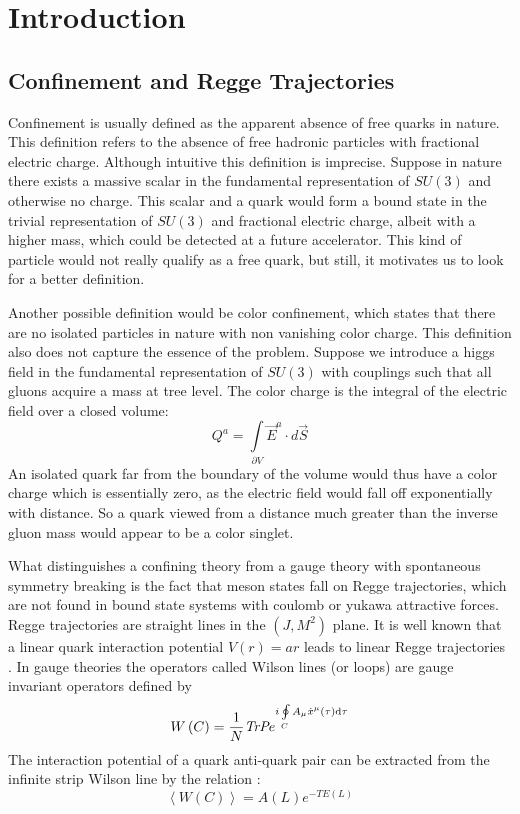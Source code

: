 \documentclass[11pt,a4paper]{article}
\begin{document}
\section{Introduction}
\FloatBarrier
\subsection{Confinement and Regge Trajectories}

Confinement\cite{Greensite08} is usually defined as the apparent absence of free quarks in nature. This definition refers to the absence of free hadronic particles with fractional electric charge. Although intuitive this definition is imprecise. Suppose in nature there exists a massive scalar in the fundamental representation of $SU\left(3\right)$ and otherwise no charge. This scalar and a quark would form a bound state in the trivial representation of $SU\left(3\right)$ and fractional electric charge, albeit with a higher mass, which could be detected at a future accelerator. This kind of particle would not really qualify as a free quark, but still, it motivates us to look for a better definition.

Another possible definition would be color confinement, which states that there are no isolated particles in nature with non vanishing color charge. This definition also does not capture the essence of the problem. Suppose we introduce a higgs field in the fundamental representation of $SU\left(3\right)$ with couplings such that all gluons acquire a mass at tree level. The color charge is the integral of the electric field over a closed volume:
\begin{equation}
Q^a=\int\limits_{\partial V} \vec{E}^a \cdot d\vec{S}
\end{equation}
An isolated quark far from the boundary of the volume would thus have a color charge which is essentially zero, as the electric field would fall off exponentially with distance. So a quark viewed from a distance much greater than the inverse gluon mass would appear to be a color singlet.

What distinguishes a confining theory from a gauge theory with spontaneous symmetry breaking is the fact that meson states fall on Regge trajectories, which are not found in bound state systems with coulomb or yukawa attractive forces. Regge trajectories are straight lines in the $\left(J,M^2\right)$ plane. It is well known that a linear quark interaction potential $V(r)=a r$ leads to linear Regge trajectories \cite{LUCHA89}. In gauge theories the operators called Wilson lines (or loops) are gauge invariant operators defined by
\begin{equation}
W\left(C\right)=\frac{1}{N}\emph{TrP} e^{i\oint\limits_CA_\mu \dot{x}^\mu\left(\tau\right)\mathrm{d}\tau }
\end{equation}
The interaction potential of a quark anti-quark pair can be extracted from the infinite strip Wilson line by the relation \cite{Sonnenschein00}:
\begin{equation}
\left\langle W\left(C\right)\right\rangle=A\left(L\right)e^{-TE\left(L\right)}
\end{equation}
\end{document}
